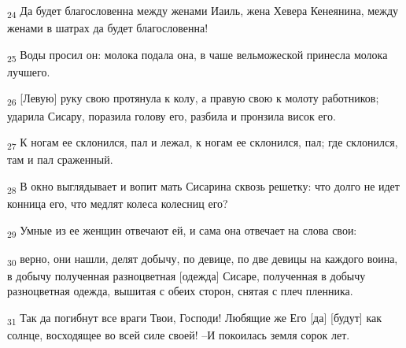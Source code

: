 \begin{tcolorbox}
\textsubscript{24} Да будет благословенна между женами Иаиль, жена Хевера Кенеянина, между женами в шатрах да будет благословенна!
\end{tcolorbox}
\begin{tcolorbox}
\textsubscript{25} Воды просил он: молока подала она, в чаше вельможеской принесла молока лучшего.
\end{tcolorbox}
\begin{tcolorbox}
\textsubscript{26} [Левую] руку свою протянула к колу, а правую свою к молоту работников; ударила Сисару, поразила голову его, разбила и пронзила висок его.
\end{tcolorbox}
\begin{tcolorbox}
\textsubscript{27} К ногам ее склонился, пал и лежал, к ногам ее склонился, пал; где склонился, там и пал сраженный.
\end{tcolorbox}
\begin{tcolorbox}
\textsubscript{28} В окно выглядывает и вопит мать Сисарина сквозь решетку: что долго не идет конница его, что медлят колеса колесниц его?
\end{tcolorbox}
\begin{tcolorbox}
\textsubscript{29} Умные из ее женщин отвечают ей, и сама она отвечает на слова свои:
\end{tcolorbox}
\begin{tcolorbox}
\textsubscript{30} верно, они нашли, делят добычу, по девице, по две девицы на каждого воина, в добычу полученная разноцветная [одежда] Сисаре, полученная в добычу разноцветная одежда, вышитая с обеих сторон, снятая с плеч пленника.
\end{tcolorbox}
\begin{tcolorbox}
\textsubscript{31} Так да погибнут все враги Твои, Господи! Любящие же Его [да] [будут] как солнце, восходящее во всей силе своей! --И покоилась земля сорок лет.
\end{tcolorbox}
